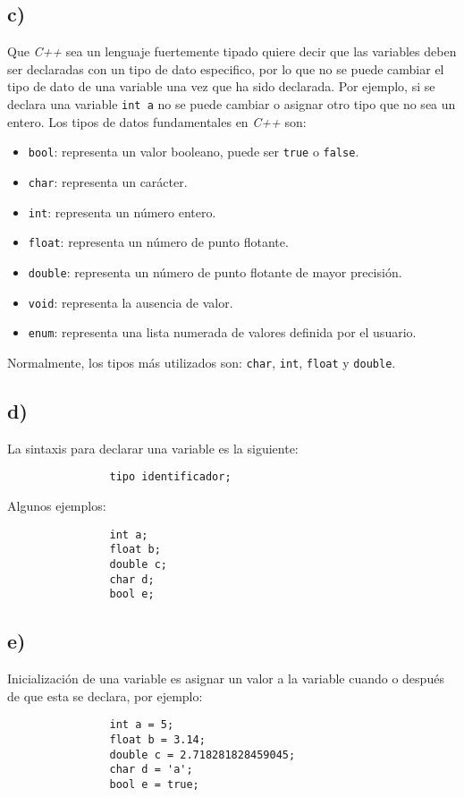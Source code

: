 \documentclass[10pt]{article}
\begin{document}
        \subsection*{c)}
            Que \textit{C++} sea un lenguaje fuertemente tipado quiere decir que las variables deben ser declaradas con un tipo de dato especifico, por lo que no se puede cambiar el tipo de dato de una variable una vez que ha sido declarada. Por ejemplo, si se declara una variable \texttt{int a} no se puede cambiar o asignar otro tipo que no sea un entero.
            Los tipos de datos fundamentales en \textit{C++} son:
            \begin{itemize}
                \item \texttt{bool}: representa un valor booleano, puede ser \texttt{true} o \texttt{false}.
                \item \texttt{char}: representa un carácter.
                \item \texttt{int}: representa un número entero.
                \item \texttt{float}: representa un número de punto flotante.
                \item \texttt{double}: representa un número de punto flotante de mayor precisión.
                \item \texttt{void}: representa la ausencia de valor.
                \item \texttt{enum}: representa una lista numerada de valores definida por el usuario.
            \end{itemize}
            Normalmente, los tipos más utilizados son: \texttt{char}, \texttt{int}, \texttt{float} y \texttt{double}.

        
        \subsection*{d)}
            La sintaxis para declarar una variable es la siguiente:
            \begin{lstlisting}
                tipo identificador;
            \end{lstlisting}
            Algunos ejemplos:
            \begin{lstlisting}
                int a;
                float b;
                double c;
                char d;
                bool e;
            \end{lstlisting}


        \subsection*{e)}
            Inicialización de una variable es asignar un valor a la variable cuando o después de que esta se declara, por ejemplo:
            \begin{lstlisting}
                int a = 5;
                float b = 3.14;
                double c = 2.718281828459045;
                char d = 'a';
                bool e = true;
            \end{lstlisting}
\end{document}
